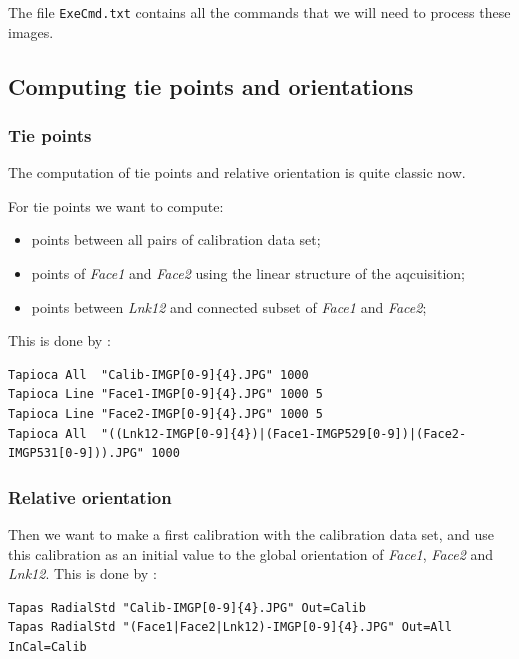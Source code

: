 The file {\tt  ExeCmd.txt} contains all the commands that we will need to process these images.



\subsection{Computing tie points and orientations}


\subsubsection{Tie points}

The computation of tie points and relative orientation is quite
classic now. 

For tie points we want to compute:

\begin{itemize}
   \item  points  between all pairs of calibration data set;
   \item  points  of \emph{Face1} and \emph{Face2} using the linear structure of
          the aqcuisition;
   \item  points  between \emph{Lnk12} and connected subset of  \emph{Face1} and \emph{Face2};
\end{itemize}

This is done by :

\begin{verbatim}
Tapioca All  "Calib-IMGP[0-9]{4}.JPG" 1000
Tapioca Line "Face1-IMGP[0-9]{4}.JPG" 1000 5
Tapioca Line "Face2-IMGP[0-9]{4}.JPG" 1000 5
Tapioca All  "((Lnk12-IMGP[0-9]{4})|(Face1-IMGP529[0-9])|(Face2-IMGP531[0-9])).JPG" 1000
\end{verbatim}


\subsubsection{Relative orientation}

Then we want to make a first calibration with the calibration data set, and
use this calibration as an initial value to the global orientation of
\emph{Face1},  \emph{Face2} and \emph{Lnk12}. This is done by :

\begin{verbatim}
Tapas RadialStd "Calib-IMGP[0-9]{4}.JPG" Out=Calib
Tapas RadialStd "(Face1|Face2|Lnk12)-IMGP[0-9]{4}.JPG" Out=All InCal=Calib
\end{verbatim}

